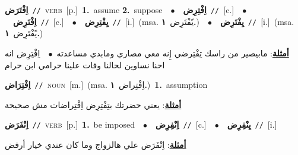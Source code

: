 \documentclass[10pt,a4paper,twoside]{article} %
\begin{document}
\begin{multicols}{2}
{\setlength\topsep{0pt}\textbf{\foreignlanguage{arabic}{اِفْتَرَض}}\ {\color{gray}\texttt{//}\color{black}}\ \textsc{verb}\ [p.]\ \textbf{1.}~assume  \textbf{2.}~suppose\ \ $\bullet$\ \ \setlength\topsep{0pt}\textbf{\foreignlanguage{arabic}{اِفْتِرِض}}\ {\color{gray}\texttt{//}\color{black}}\ [c.]\ \ $\bullet$\ \ \setlength\topsep{0pt}\textbf{\foreignlanguage{arabic}{اِفْتَرِض}}\ {\color{gray}\texttt{//}\color{black}}\ [c.]\ \ $\bullet$\ \ \setlength\topsep{0pt}\textbf{\foreignlanguage{arabic}{يِفْتِرِض}}\ {\color{gray}\texttt{//}\color{black}}\ [i.]\ \color{gray}(msa. \foreignlanguage{arabic}{يًفْتَرِض}~\foreignlanguage{arabic}{\textbf{١.}})\color{black}\ \ $\bullet$\ \ \setlength\topsep{0pt}\textbf{\foreignlanguage{arabic}{يِفْتَرِض}}\ {\color{gray}\texttt{//}\color{black}}\ [i.]\ \color{gray}(msa. \foreignlanguage{arabic}{يًفْتَرِض}~\foreignlanguage{arabic}{\textbf{١.}})\color{black}\  \begin{flushright}\color{gray}\foreignlanguage{arabic}{\textbf{\underline{\foreignlanguage{arabic}{أمثلة}}}: مابيصير من راسك تِفْتِرضي إِنه معي مصاري ومابدي مساعدته\ $\bullet$\ \  اِفْتِرِض انه احنا نساوين لحالنا وفات علينا حرامي ابن حرام}\end{flushright}\color{black}} \vspace{2mm}

{\setlength\topsep{0pt}\textbf{\foreignlanguage{arabic}{اِفْتِرَاض}}\ {\color{gray}\texttt{//}\color{black}}\ \textsc{noun}\ [m.]\ \color{gray}(msa. \foreignlanguage{arabic}{اِفْتِراض}~\foreignlanguage{arabic}{\textbf{١.}})\color{black}\ \textbf{1.}~assumption\  \begin{flushright}\color{gray}\foreignlanguage{arabic}{\textbf{\underline{\foreignlanguage{arabic}{أمثلة}}}: يعني حضرتك بتِفْتِرِض اِفْتِراضات مش صحيحة}\end{flushright}\color{black}} \vspace{2mm}

{\setlength\topsep{0pt}\textbf{\foreignlanguage{arabic}{اِنْفَرَض}}\ {\color{gray}\texttt{//}\color{black}}\ \textsc{verb}\ [p.]\ \textbf{1.}~be imposed\ \ $\bullet$\ \ \setlength\topsep{0pt}\textbf{\foreignlanguage{arabic}{اِنْفِرِض}}\ {\color{gray}\texttt{//}\color{black}}\ [c.]\ \ $\bullet$\ \ \setlength\topsep{0pt}\textbf{\foreignlanguage{arabic}{يِنْفِرِض}}\ {\color{gray}\texttt{//}\color{black}}\ [i.]\  \begin{flushright}\color{gray}\foreignlanguage{arabic}{\textbf{\underline{\foreignlanguage{arabic}{أمثلة}}}: اِنْفَرَض علي هالزواج وما كان عندي خيار أرفض}\end{flushright}\color{black}} \vspace{2mm}


\end{multicols}
\end{document}
